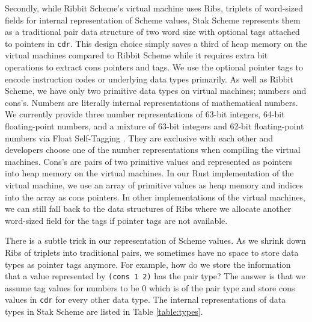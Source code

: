 \documentclass[sigplan, anonymous, review]{acmart}
\begin{document}
Secondly, while Ribbit Scheme's virtual machine uses Ribs, triplets of
word-sized fields for internal representation of Scheme values, Stak
Scheme represents them as a traditional pair data structure of two
word size with optional tags attached to pointers in \texttt{cdr}.
This design choice simply saves a third of heap memory on the virtual machines
compared to Ribbit Scheme while it requires extra bit operations to
extract cons pointers and tags.
We use the optional pointer tags to encode instruction
codes or underlying data types primarily.
As well as Ribbit Scheme, we have only two primitive data types on virtual
machines; numbers and cons's.
Numbers are literally internal representations of mathematical numbers.
We currently provide three number
representations of 63-bit integers, 64-bit floating-point numbers,
and a mixture of 63-bit integers and 62-bit floating-point numbers
via Float Self-Tagging \cite{floatselftag}.
They are exclusive with each other and developers choose one
of the number representations when compiling the virtual machines.
Cons's are pairs of two primitive values and represented as
pointers into heap memory on the virtual machines.
In our Rust implementation of the virtual machine, we use an array of
primitive values as heap memory and indices into the array as cons
pointers.
In other implementations of the virtual machines, we can still fall
back to the data structures of Ribs where we allocate another
word-sized field for the tags if pointer tags are not available.

There is a subtle trick in our representation of Scheme values.
As we shrink down Ribs of triplets into traditional pairs, we sometimes
have no space to store data types as pointer tags anymore.
For example, how do we store the information that a value represented
by \texttt{(cons 1 2)} has the pair type?
The answer is that we assume tag values for numbers to be 0 which is of
the pair type
and store cons values in \texttt{cdr} for every other data type.
The internal representations of data types in Stak Scheme are listed
in Table \ref{table:types}.
\end{document}
